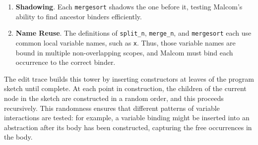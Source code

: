 \documentclass[acmsmall,dvipsnames,10pt,nonacm]{acmart}\settopmatter{printfolios=true} %
\begin{document}

\begin{enumerate}
    \item \textbf{Shadowing}. Each \texttt{mergesort} shadows the one before it, testing Malcom's ability to find ancestor binders efficiently.
    \item \textbf{Name Reuse}. The definitions of \texttt{split\_n}, \texttt{merge\_n}, and \texttt{mergesort} each use common local variable names, such as \texttt{x}. Thus, those variable names are bound in multiple non-overlapping scopes, and Malcom must bind each occurrence to the correct binder.
\end{enumerate}

The edit trace builds this tower by inserting constructors at leaves of the program sketch until complete. At each point in construction, the children of the current node in the sketch are constructed in a random order, and this proceeds recursively. This randomness ensures that different patterns of variable interactions are tested: for example, a variable binding might be inserted into an abstraction after its body has been constructed, capturing the free occurrences in the body.
\end{document}
